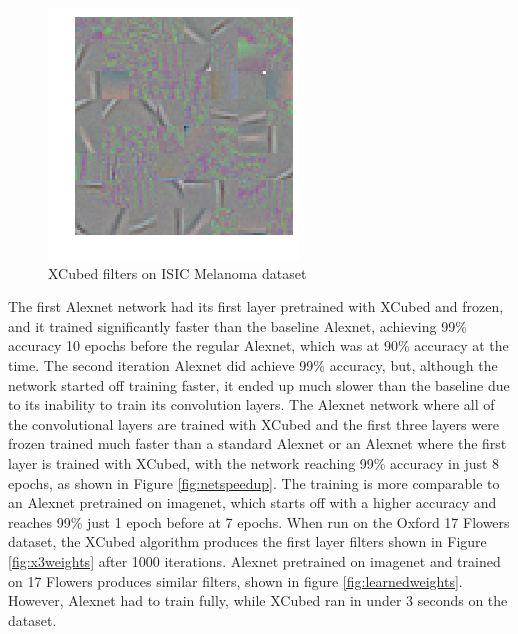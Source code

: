 \documentclass[twocolumn]{article}
\begin{document}
\begin{figure}[!htb]
    \centering
    \includegraphics[width=.8\linewidth]{melafet}
    \caption{XCubed filters on ISIC Melanoma dataset}
    \label{fig:melanoma}
\end{figure}
The first Alexnet network had its first layer pretrained with XCubed and frozen, and it trained significantly faster than the baseline Alexnet, achieving 99\% accuracy 10 epochs before the regular Alexnet, which was at 90\% accuracy at the time. The second iteration Alexnet did achieve 99\% accuracy, but, although the network started off training faster, it ended up much slower than the baseline due to its inability to train its convolution layers. The Alexnet network where all of the convolutional layers are trained with XCubed and the first three layers were frozen trained much faster than a standard Alexnet or an Alexnet where the first layer is trained with XCubed, with the network reaching 99\% accuracy in just 8 epochs, as shown in Figure \ref{fig:netspeedup}. The training is more comparable to an Alexnet pretrained on imagenet, which starts off with a higher accuracy and reaches 99\% just 1 epoch before at 7 epochs. When run on the Oxford 17 Flowers dataset, the XCubed algorithm produces the first layer filters shown in Figure \ref{fig:x3weights} after 1000 iterations. Alexnet pretrained on imagenet and trained on 17 Flowers produces similar filters, shown in figure \ref{fig:learnedweights}. However, Alexnet had to train fully, while XCubed ran in under 3 seconds on the dataset.
\end{document}
